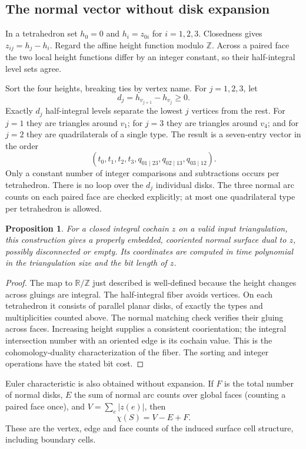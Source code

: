 \documentclass[11pt]{article}
\newtheorem{proposition}[theorem]{Proposition}
\theoremstyle{remark}\newtheorem{remark}[theorem]{Remark}
\newcommand{\Z}{\mathbb Z}
\begin{document}
\subsection{The normal vector without disk expansion}
In a tetrahedron set $h_0=0$ and $h_i=z_{0i}$ for $i=1,2,3$. Closedness gives
$z_{ij}=h_j-h_i$. Regard the affine height function modulo $\Z$. Across a
paired face the two local height functions differ by an integer constant, so
their half-integral level sets agree.

Sort the four heights, breaking ties by vertex name. For $j=1,2,3$, let
\[
 d_j=h_{v_{j+1}}-h_{v_j}\ge0.
\]
Exactly $d_j$ half-integral levels separate the lowest $j$ vertices from the
rest. For $j=1$ they are triangles around $v_1$; for $j=3$ they are triangles
around $v_4$; and for $j=2$ they are quadrilaterals of a single type. The result
is a seven-entry vector in the order
\[
 (t_0,t_1,t_2,t_3,q_{01\mid23},q_{02\mid13},q_{03\mid12}).
\]
Only a constant number of integer comparisons and subtractions occurs per
tetrahedron. There is no loop over the $d_j$ individual disks. The three normal
arc counts on each paired face are checked explicitly; at most one
quadrilateral type per tetrahedron is allowed.

\begin{proposition}
For a closed integral cochain $z$ on a valid input triangulation, this
construction gives a properly embedded, cooriented normal surface dual to $z$,
possibly disconnected or empty. Its coordinates are computed in time
polynomial in the triangulation size and the bit length of $z$.
\end{proposition}
\begin{proof}
The map to $\mathbb R/\mathbb Z$ just described is well-defined because the
height changes across gluings are integral. The half-integral fiber avoids
vertices. On each tetrahedron it consists of parallel planar disks, of exactly
the types and multiplicities counted above. The normal matching check verifies
their gluing across faces. Increasing height supplies a consistent
coorientation; the integral intersection number with an oriented edge is its
cochain value. This is the cohomology-duality characterization of the fiber.
The sorting and integer operations have the stated bit cost.
\end{proof}

Euler characteristic is also obtained without expansion. If $F$ is the total
number of normal disks, $E$ the sum of normal arc counts over global faces
(counting a paired face once), and $V=\sum_e|z(e)|$, then
\[
 \chi(S)=V-E+F.
\]
These are the vertex, edge and face counts of the induced surface cell
structure, including boundary cells.
\end{document}
